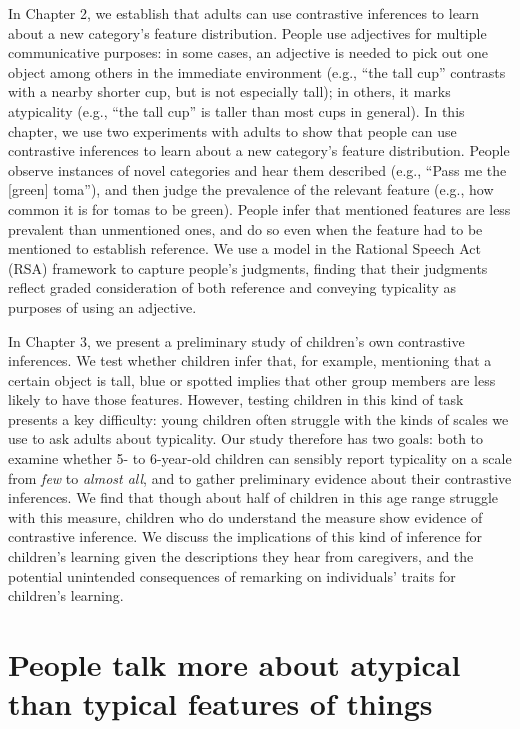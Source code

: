\documentclass{ucetd}
\begin{document}
In Chapter 2, we establish that adults can use contrastive inferences to
learn about a new category's feature distribution. People use adjectives
for multiple communicative purposes: in some cases, an adjective is
needed to pick out one object among others in the immediate environment
(e.g., ``the tall cup'' contrasts with a nearby shorter cup, but is not
especially tall); in others, it marks atypicality (e.g., ``the tall
cup'' is taller than most cups in general). In this chapter, we use two
experiments with adults to show that people can use contrastive
inferences to learn about a new category's feature distribution. People
observe instances of novel categories and hear them described (e.g.,
``Pass me the {[}green{]} toma''), and then judge the prevalence of the
relevant feature (e.g., how common it is for tomas to be green). People
infer that mentioned features are less prevalent than unmentioned ones,
and do so even when the feature had to be mentioned to establish
reference. We use a model in the Rational Speech Act (RSA) framework to
capture people's judgments, finding that their judgments reflect graded
consideration of both reference and conveying typicality as purposes of
using an adjective.

In Chapter 3, we present a preliminary study of children's own
contrastive inferences. We test whether children infer that, for
example, mentioning that a certain object is tall, blue or spotted
implies that other group members are less likely to have those features.
However, testing children in this kind of task presents a key
difficulty: young children often struggle with the kinds of scales we
use to ask adults about typicality. Our study therefore has two goals:
both to examine whether 5- to 6-year-old children can sensibly report
typicality on a scale from \emph{few} to \emph{almost all}, and to
gather preliminary evidence about their contrastive inferences. We find
that though about half of children in this age range struggle with this
measure, children who do understand the measure show evidence of
contrastive inference. We discuss the implications of this kind of
inference for children's learning given the descriptions they hear from
caregivers, and the potential unintended consequences of remarking on
individuals' traits for children's learning.

\hypertarget{people-talk-more-about-atypical-than-typical-features-of-things}{%
\chapter{People talk more about atypical than typical features of
things}\label{people-talk-more-about-atypical-than-typical-features-of-things}}
\end{document}
